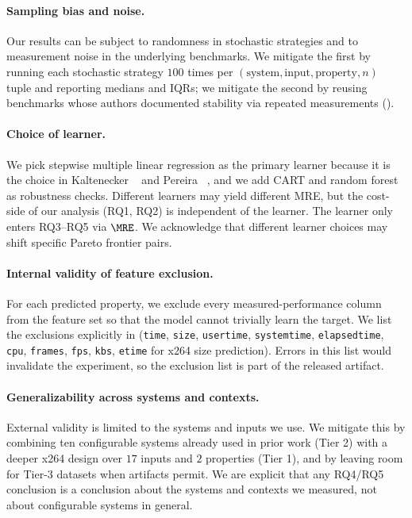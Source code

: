 \paragraph*{Sampling bias and noise.}
Our results can be subject to randomness in stochastic strategies and to
measurement noise in the underlying benchmarks. We mitigate the first by
running each stochastic strategy $100$ times per
$(\text{system},\text{input},\text{property},n)$ tuple and reporting medians
and IQRs; we mitigate the second by reusing benchmarks whose authors
documented stability via repeated measurements ().

\paragraph*{Choice of learner.}
We pick stepwise multiple linear regression as the primary learner because it
is the choice in Kaltenecker \etal~\cite{kaltenecker2019} and Pereira
\etal~\cite{pereira2020}, and we add CART and random forest as robustness
checks. Different learners may yield different MRE, but the cost-side of our
analysis (RQ1, RQ2) is independent of the learner. The learner only enters
RQ3--RQ5 via $\MRE$. We acknowledge that different learner choices may shift
specific Pareto frontier pairs.

\paragraph*{Internal validity of feature exclusion.}
For each predicted property, we exclude every measured-performance column
from the feature set so that the model cannot trivially learn the target. We
list the exclusions explicitly in  (\eg \texttt{time},
\texttt{size}, \texttt{usertime}, \texttt{systemtime}, \texttt{elapsedtime},
\texttt{cpu}, \texttt{frames}, \texttt{fps}, \texttt{kbs}, \texttt{etime} for
x264 size prediction). Errors in this list would invalidate the experiment,
so the exclusion list is part of the released artifact.

\paragraph*{Generalizability across systems and contexts.}
External validity is limited to the systems and inputs we use. We mitigate
this by combining ten configurable systems already used in prior work (Tier
2) with a deeper x264 design over $17$ inputs and $2$ properties (Tier 1),
and by leaving room for Tier-3 datasets when artifacts permit. We are
explicit that any RQ4/RQ5 conclusion is a conclusion about the systems and
contexts we measured, not about configurable systems in general.

